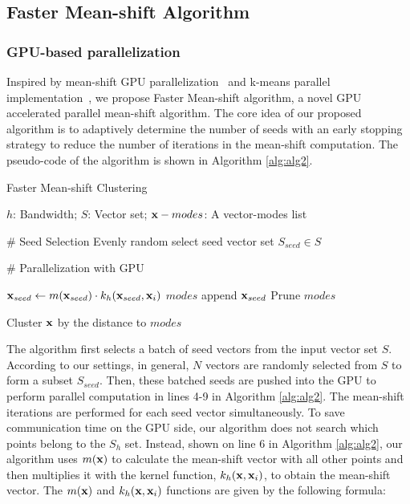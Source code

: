 \documentclass[journal,twoside,web]{ieeecolor}
\begin{document}
\subsection{Faster Mean-shift Algorithm}
\subsubsection{GPU-based parallelization}
Inspired by mean-shift GPU parallelization~\cite{b18} and k-means parallel implementation~\cite{b37}, we propose Faster Mean-shift algorithm, a novel GPU accelerated parallel mean-shift algorithm. The core idea of our proposed algorithm is to adaptively determine the number of seeds with an early stopping strategy to reduce the number of iterations in the mean-shift computation. The pseudo-code of the algorithm is shown in Algorithm \ref{alg:alg2}.

\begin{algorithm}[h]  
  \caption{Faster Mean-shift Clustering}  
  \label{alg:alg2}  
  \begin{algorithmic}[1] 
    \Require 
      $h$: Bandwidth;  
      $S$: Vector set;  
    \Ensure  
      ${\bf{x}}-modes$: A vector-modes list 
      
    \State \# Seed Selection
    \State Evenly random select seed vector set $S_{seed} \in S$
    
    \State \# Parallelization with GPU
    
            \State ${{\bf{x}}_{seed}} \gets m({\bf{x}}_{seed}) \cdot {k_h}({\bf{x}}_{seed},{{\bf{x}}_i})$
        \EndWhile
        \State $modes$ append ${{\bf{x}}_{seed}}$
    \EndFor
    \State Prune $modes$
    
        \State Cluster ${\bf{x}}$ by the distance to $modes$
    \EndFor
  \end{algorithmic}  
\end{algorithm} 

The algorithm first selects a batch of seed vectors from the input vector set $S$. According to our settings, in general, $N$ vectors are randomly selected from $S$ to form a subset $S_{seed}$. Then, these batched seeds are pushed into the GPU to perform parallel computation in lines 4-9 in Algorithm \ref{alg:alg2}. The mean-shift iterations are performed for each seed vector simultaneously. To save communication time on the GPU side, our algorithm does not search which points belong to the $S_h$ set. Instead, shown on line 6 in Algorithm \ref{alg:alg2}, our algorithm uses $m({\bf{x}})$ to calculate the mean-shift vector with all other points and then multiplies it with the kernel function, ${k_h}({\bf{x}},{{\bf{x}}_i})$, to obtain the mean-shift vector. The $m({\bf{x}})$ and ${k_h}({\bf{x}},{{\bf{x}}_i})$ functions are given by the following formula:
\end{document}
